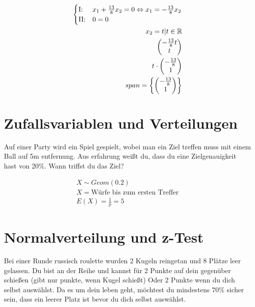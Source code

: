 \begin{align*}
    \begin{cases}
        \text{I:\@}  & x_1 + \frac{13}{8}x_2 = 0 \Leftrightarrow x_1 = -\frac{13}{8}x_2 \\
        \text{II:\@} & 0 = 0
    \end{cases} \\
    x_2 = t | t \in \mathbb{R}                                                      \\
    \begin{pmatrix}
        -\frac{13}{8}t \\
        t
    \end{pmatrix}                                                                  \\
    t \cdot \begin{pmatrix}
                -\frac{13}{8} \\ 1
            \end{pmatrix}                                                       \\
    span = \left\{\begin{pmatrix}
                      -\frac{13}{8} \\ 1
                  \end{pmatrix}\right\}
\end{align*}

\section{Zufallsvariablen und Verteilungen}

Auf einer Party wird ein Spiel gespielt, wobei man ein Ziel treffen muss mit
einem Ball auf 5m entfernung. Aus erfahrung weißt du, dass du eine
Zielgenauigkeit hast von 20\%. Wann triffst du das Ziel?

\begin{align*}
    X \sim Geom(0.2)                        \\
    X = \text{Würfe bis zum ersten Treffer} \\
    E(X) = \frac{1}{p} = 5
\end{align*}

\section{Normalverteilung und z-Test}

Bei einer Runde russisch roulette wurden 2 Kugeln reingetan und 8 Plätze leer
gelassen. Du bist an der Reihe und kannst für 2 Punkte auf dein gegenüber
schießen (gibt nur punkte, wenn Kugel schießt) Oder 2 Punkte wenn du dich
selbst auswählst. Da es um dein leben geht, möchtest du mindestens $70\%$
sicher sein, dass ein leerer Platz ist bevor du dich selbst auswählst.

